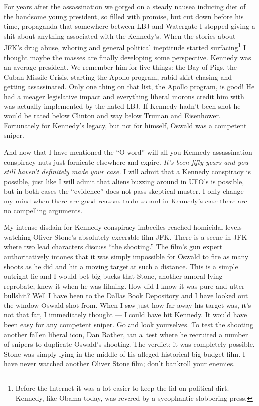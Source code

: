 For years after the assassination we gorged on a steady nausea inducing
diet of the handsome young president, so filled with promise, but cut
down before his time, propaganda that somewhere between LBJ and
Watergate I stopped giving a shit about anything associated with the
Kennedy's. When the stories about JFK's drug abuse, whoring and general
political ineptitude started
surfacing\footnote{
Before the Internet it was a lot easier to keep the lid on political
dirt. Kennedy, like Obama today, was revered by a sycophantic slobbering press.
} I thought maybe the masses
are finally developing some perspective. Kennedy was an average
president. We remember him for five things: the Bay of Pigs, the Cuban
Missile Crisis, starting the Apollo program, rabid skirt chasing and
getting assassinated. Only one thing on that list, the Apollo program,
is good! He had a meager legislative impact and everything liberal
morons credit him with was actually implemented by the hated LBJ. If
Kennedy hadn't been shot he would be rated below Clinton and way below
Truman and Eisenhower. Fortunately for Kennedy's legacy, but not for
himself, Oswald was a competent sniper.

And now that I have mentioned the ``O-word'' will all you Kennedy
assassination conspiracy nuts just fornicate elsewhere and
expire. \emph{It's been fifty years and you still haven't definitely made
your case.} I will admit that a Kennedy conspiracy is possible, just
like I will admit that aliens buzzing around in UFO's is possible, but
in both cases the ``evidence'' does not pass skeptical muster. I only
change my mind when there are good reasons to do so and in Kennedy's
case there are no compelling arguments.

My intense disdain for Kennedy conspiracy imbeciles reached homicidal
levels watching Oliver Stone's absolutely execrable film JFK. There is a
scene in JFK where two lead characters discuss ``the shooting.'' The
film's gun expert authoritatively intones that it was simply impossible
for Oswald to fire as many shoots as he did and hit a moving target at
such a distance. This is a simple outright lie and I would bet big bucks
that Stone, another amoral lying reprobate, knew it when he was filming.
How did I know it was pure and utter bullshit? Well I have been to the
Dallas Book Depository and I have looked out the window Oswald shot
from. When I saw just how far away his target was, it's not that far, I
immediately thought --- I could have hit Kennedy. It would have been
easy for any competent sniper. Go and look yourselves. To test the
shooting another fallen liberal icon, Dan Rather, ran a~test where he
recruited a number of snipers to duplicate Oswald's shooting. The
verdict: it was completely possible. Stone was simply lying in the
middle of his alleged historical big budget film. I have never watched
another Oliver Stone film; don't bankroll your enemies.

